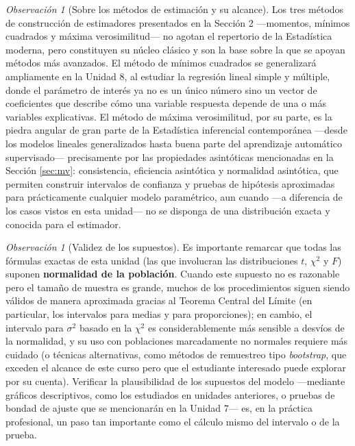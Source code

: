 \documentclass[11pt,a4paper]{article}
\theoremstyle{plain}
\theoremstyle{definition}
\theoremstyle{remark}
\newtheorem{observacion}[teorema]{Observación}
\begin{document}
\begin{observacion}[Sobre los métodos de estimación y su alcance]
Los tres métodos de construcción de estimadores presentados en la Sección 2 —momentos, mínimos cuadrados y máxima verosimilitud— no agotan el repertorio de la Estadística moderna, pero constituyen su núcleo clásico y son la base sobre la que se apoyan métodos más avanzados. El método de mínimos cuadrados se generalizará ampliamente en la Unidad 8, al estudiar la regresión lineal simple y múltiple, donde el parámetro de interés ya no es un único número sino un vector de coeficientes que describe cómo una variable respuesta depende de una o más variables explicativas. El método de máxima verosimilitud, por su parte, es la piedra angular de gran parte de la Estadística inferencial contemporánea —desde los modelos lineales generalizados hasta buena parte del aprendizaje automático supervisado— precisamente por las propiedades asintóticas mencionadas en la Sección \ref{sec:mv}: consistencia, eficiencia asintótica y normalidad asintótica, que permiten construir intervalos de confianza y pruebas de hipótesis aproximadas para prácticamente cualquier modelo paramétrico, aun cuando —a diferencia de los casos vistos en esta unidad— no se disponga de una distribución exacta y conocida para el estimador.
\end{observacion}

\begin{observacion}[Validez de los supuestos]
Es importante remarcar que todas las fórmulas exactas de esta unidad (las que involucran las distribuciones $t$, $\chi^2$ y $F$) suponen \textbf{normalidad de la población}. Cuando este supuesto no es razonable pero el tamaño de muestra es grande, muchos de los procedimientos siguen siendo válidos de manera aproximada gracias al Teorema Central del Límite (en particular, los intervalos para medias y para proporciones); en cambio, el intervalo para $\sigma^2$ basado en la $\chi^2$ es considerablemente más sensible a desvíos de la normalidad, y su uso con poblaciones marcadamente no normales requiere más cuidado (o técnicas alternativas, como métodos de remuestreo tipo \emph{bootstrap}, que exceden el alcance de este curso pero que el estudiante interesado puede explorar por su cuenta). Verificar la plausibilidad de los supuestos del modelo —mediante gráficos descriptivos, como los estudiados en unidades anteriores, o pruebas de bondad de ajuste que se mencionarán en la Unidad 7— es, en la práctica profesional, un paso tan importante como el cálculo mismo del intervalo o de la prueba.
\end{observacion}
\end{document}
